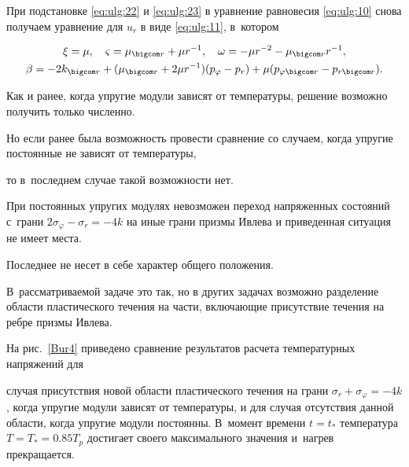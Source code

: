 При подстановке \eqref{eq:ulg:22} и \eqref{eq:ulg:23} в уравнение равновесия \eqref{eq:ulg:10} снова получаем уравнение для $u_{r} $ в виде \eqref{eq:ulg:11}, в~котором

\begin{gather} 

\xi =\mu , \quad \varsigma =\mu _{\bigcom r} +\mu r^{-1} , \quad \omega =-\mu r^{-2} -\mu _{\bigcom r} r^{-1} ,

\\ 

\beta =-2k_{\bigcom r} +(\mu _{\bigcom r} +2\mu r^{-1} ) (p_{\varphi } -p_{r} )+\mu (p_{\varphi \bigcom r} -p_{r \bigcom r} ). 

\end{gather}



Как и ранее, когда упругие модули зависят от температуры, решение возможно получить только численно. 

Но если ранее была возможность провести сравнение со случаем, когда упругие постоянные не зависят от температуры, 

то в~последнем случае такой возможности нет. 

При постоянных упругих модулях невозможен переход напряженных состояний с~грани $2\sigma _{\varphi } -\sigma _{r} =-4k$ на иные грани призмы Ивлева и приведенная ситуация не имеет места. 

Последнее не несет в себе характер общего положения. 

В~рассматриваемой задаче это так, но в других задачах возможно разделение области пластического течения на части,  включающие присутствие течения на ребре призмы Ивлева. 

На рис.~\ref{Bur4} приведено сравнение результатов расчета температурных напряжений для

случая присутствия новой области пластического течения на грани $\sigma _{r} +\sigma _{\varphi } =-4k$, когда упругие модули зависят от температуры, и для случая отсутствия данной области, когда упругие модули постоянны. В~момент времени $t=t_{*} $ температура $T=T_{*} =0.85T_{p} $ достигает своего максимального значения  и~нагрев прекращается.





